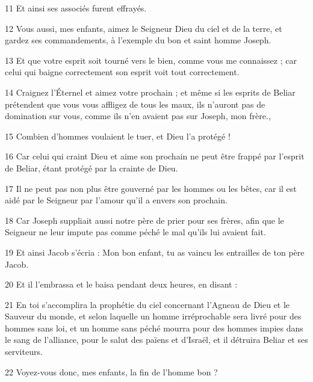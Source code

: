 \par 11 Et ainsi ses associés furent effrayés.

\par 12 Vous aussi, mes enfants, aimez le Seigneur Dieu du ciel et de la terre, et gardez ses commandements, à l'exemple du bon et saint homme Joseph.

\par 13 Et que votre esprit soit tourné vers le bien, comme vous me connaissez ; car celui qui baigne correctement son esprit voit tout correctement.

\par 14 Craignez l'Éternel et aimez votre prochain ; et même si les esprits de Beliar prétendent que vous vous affligez de tous les maux, ils n'auront pas de domination sur vous, comme ils n'en avaient pas sur Joseph, mon frère.,

\par 15 Combien d'hommes voulaient le tuer, et Dieu l'a protégé !

\par 16 Car celui qui craint Dieu et aime son prochain ne peut être frappé par l'esprit de Beliar, étant protégé par la crainte de Dieu.

\par 17 Il ne peut pas non plus être gouverné par les hommes ou les bêtes, car il est aidé par le Seigneur par l'amour qu'il a envers son prochain.

\par 18 Car Joseph suppliait aussi notre père de prier pour ses frères, afin que le Seigneur ne leur impute pas comme péché le mal qu'ils lui avaient fait.

\par 19 Et ainsi Jacob s'écria : Mon bon enfant, tu as vaincu les entrailles de ton père Jacob.

\par 20 Et il l'embrassa et le baisa pendant deux heures, en disant :

\par 21 En toi s'accomplira la prophétie du ciel concernant l'Agneau de Dieu et le Sauveur du monde, et selon laquelle un homme irréprochable sera livré pour des hommes sans loi, et un homme sans péché mourra pour des hommes impies dans le sang de l'alliance, pour le salut des païens et d'Israël, et il détruira Beliar et ses serviteurs.

\par 22 Voyez-vous donc, mes enfants, la fin de l'homme bon ?

